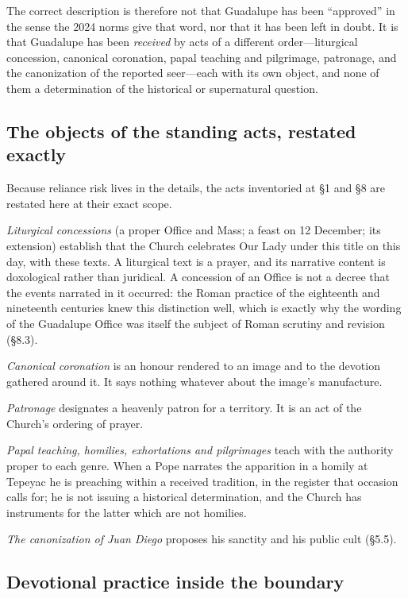 The correct description is therefore not that Guadalupe has been
``approved'' in the sense the 2024 norms give that word, nor that it
has been left in doubt. It is that Guadalupe has been \emph{received}
by acts of a different order---liturgical concession, canonical
coronation, papal teaching and pilgrimage, patronage, and the
canonization of the reported seer---each with its own object, and
none of them a determination of the historical or supernatural
question.

\subsection{The objects of the standing acts, restated exactly}

Because reliance risk lives in the details, the acts inventoried at
\S1 and \S8 are restated here at their exact scope.

\emph{Liturgical concessions} (a proper Office and Mass; a feast on
12 December; its extension) establish that the Church celebrates Our
Lady under this title on this day, with these texts. A liturgical
text is a prayer, and its narrative content is doxological rather
than juridical. A concession of an Office is not a decree that the
events narrated in it occurred: the Roman practice of the eighteenth
and nineteenth centuries knew this distinction well, which is exactly
why the wording of the Guadalupe Office was itself the subject of
Roman scrutiny and revision (\S8.3).

\emph{Canonical coronation} is an honour rendered to an image and to
the devotion gathered around it. It says nothing whatever about the
image's manufacture.

\emph{Patronage} designates a heavenly patron for a territory. It is
an act of the Church's ordering of prayer.

\emph{Papal teaching, homilies, exhortations and pilgrimages} teach
with the authority proper to each genre. When a Pope narrates the
apparition in a homily at Tepeyac he is preaching within a received
tradition, in the register that occasion calls for; he is not issuing
a historical determination, and the Church has instruments for the
latter which are not homilies.

\emph{The canonization of Juan Diego} proposes his sanctity and his
public cult (\S5.5).

\subsection{Devotional practice inside the boundary}


